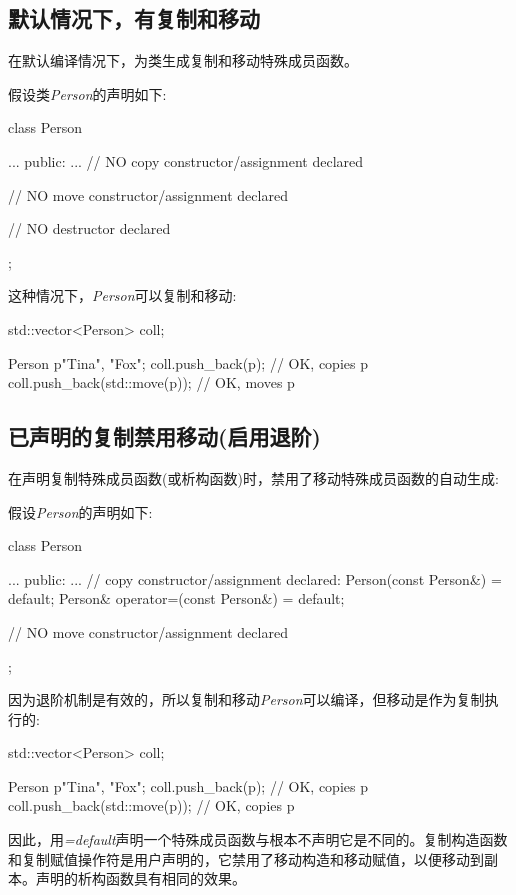 \subsection{默认情况下，有复制和移动}

在默认编译情况下，为类生成复制和移动特殊成员函数。

假设类\textit{Person}的声明如下:

\begin{cppcode}
class Person {
	...
public:
	...
	// NO copy constructor/assignment declared

	// NO move constructor/assignment declared

	// NO destructor declared
};
\end{cppcode}

这种情况下，\textit{Person}可以复制和移动:

\begin{cppcode}
std::vector<Person> coll;

Person p{"Tina", "Fox"};
coll.push_back(p); // OK, copies p
coll.push_back(std::move(p)); // OK, moves p
\end{cppcode}

\subsection{已声明的复制禁用移动(启用退阶)}

在声明复制特殊成员函数(或析构函数)时，禁用了移动特殊成员函数的自动生成:

假设\textit{Person}的声明如下:

\begin{cppcode}
class Person {
	...
public:
	...
	// copy constructor/assignment declared:
	Person(const Person&) = default;
	Person& operator=(const Person&) = default;

	// NO move constructor/assignment declared
};
\end{cppcode}

因为退阶机制是有效的，所以复制和移动\textit{Person}可以编译，但移动是作为复制执行的:

\begin{cppcode}
std::vector<Person> coll;

Person p{"Tina", "Fox"};
coll.push_back(p); // OK, copies p
coll.push_back(std::move(p)); // OK, copies p
\end{cppcode}

因此，用\textit{=default}声明一个特殊成员函数与根本不声明它是不同的。复制构造函数和复制赋值操作符是用户声明的，它禁用了移动构造和移动赋值，以便移动到副本。声明的析构函数具有相同的效果。

